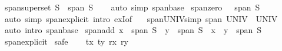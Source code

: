 \begin{isabellebody}
\endisatagproof
{\isafoldproof}%
%
\isadelimproof
\isanewline
%
\endisadelimproof
\isanewline
{}\isamarkupfalse%
\ span{\isacharunderscore}{\kern0pt}superset{\isacharcolon}{\kern0pt}\ {\isachardoublequoteopen}S\ {\isasymsubseteq}\ span\ S{\isachardoublequoteclose}\isanewline
%
\isadelimproof
\ \ %
\endisadelimproof
%
\isatagproof
{}\isamarkupfalse%
\ {\isacharparenleft}{\kern0pt}auto\ simp{\isacharcolon}{\kern0pt}\ span{\isacharunderscore}{\kern0pt}base{\isacharparenright}{\kern0pt}%
\endisatagproof
{\isafoldproof}%
%
\isadelimproof
\isanewline
%
\endisadelimproof
\isanewline
{}\isamarkupfalse%
\ span{\isacharunderscore}{\kern0pt}zero{\isacharcolon}{\kern0pt}\ {\isachardoublequoteopen}{}\ {\isasymin}\ span\ S{\isachardoublequoteclose}\isanewline
%
\isadelimproof
\ \ %
\endisadelimproof
%
\isatagproof
{}\isamarkupfalse%
\ {\isacharparenleft}{\kern0pt}auto\ simp{\isacharcolon}{\kern0pt}\ span{\isacharunderscore}{\kern0pt}explicit\ intro{\isacharbang}{\kern0pt}{\isacharcolon}{\kern0pt}\ exI{\isacharbrackleft}{\kern0pt}of\ {\isacharunderscore}{\kern0pt}\ {\isachardoublequoteopen}{\isacharbraceleft}{\kern0pt}{\isacharbraceright}{\kern0pt}{\isachardoublequoteclose}{\isacharbrackright}{\kern0pt}{\isacharparenright}{\kern0pt}%
\endisatagproof
{\isafoldproof}%
%
\isadelimproof
\isanewline
%
\endisadelimproof
\isanewline
{}\isamarkupfalse%
\ span{\isacharunderscore}{\kern0pt}UNIV{\isacharbrackleft}{\kern0pt}simp{\isacharbrackright}{\kern0pt}{\isacharcolon}{\kern0pt}\ {\isachardoublequoteopen}span\ UNIV\ {\isacharequal}{\kern0pt}\ UNIV{\isachardoublequoteclose}\isanewline
%
\isadelimproof
\ \ %
\endisadelimproof
%
\isatagproof
{}\isamarkupfalse%
\ {\isacharparenleft}{\kern0pt}auto\ intro{\isacharcolon}{\kern0pt}\ span{\isacharunderscore}{\kern0pt}base{\isacharparenright}{\kern0pt}%
\endisatagproof
{\isafoldproof}%
%
\isadelimproof
\isanewline
%
\endisadelimproof
\isanewline
{}\isamarkupfalse%
\ span{\isacharunderscore}{\kern0pt}add{\isacharcolon}{\kern0pt}\ {\isachardoublequoteopen}x\ {\isasymin}\ span\ S\ {\isasymLongrightarrow}\ y\ {\isasymin}\ span\ S\ {\isasymLongrightarrow}\ x\ {\isacharplus}{\kern0pt}\ y\ {\isasymin}\ span\ S{\isachardoublequoteclose}\isanewline
%
\isadelimproof
\ \ %
\endisadelimproof
%
\isatagproof
{}\isamarkupfalse%
\ span{\isacharunderscore}{\kern0pt}explicit\isanewline
{}\isamarkupfalse%
\ safe\isanewline
\ \ \isamarkupfalse%
\ tx\ ty\ rx\ ry\ \isamarkupfalse%

\end{isabellebody}
